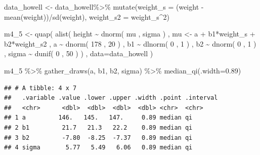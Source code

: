 \documentclass[
]{book}
\newenvironment{Shaded}{\begin{snugshade}}{\end{snugshade}}
\newcommand{\AttributeTok}[1]{\textcolor[rgb]{0.77,0.63,0.00}{#1}}
\newcommand{\DecValTok}[1]{\textcolor[rgb]{0.00,0.00,0.81}{#1}}
\newcommand{\FloatTok}[1]{\textcolor[rgb]{0.00,0.00,0.81}{#1}}
\newcommand{\FunctionTok}[1]{\textcolor[rgb]{0.00,0.00,0.00}{#1}}
\newcommand{\NormalTok}[1]{#1}
\newcommand{\OtherTok}[1]{\textcolor[rgb]{0.56,0.35,0.01}{#1}}
\newcommand{\SpecialCharTok}[1]{\textcolor[rgb]{0.00,0.00,0.00}{#1}}
\begin{document}
\begin{Shaded}
\begin{Highlighting}[]
\NormalTok{data\_howell }\OtherTok{\textless{}{-}}\NormalTok{ data\_howell}\SpecialCharTok{\%\textgreater{}\%}
  \FunctionTok{mutate}\NormalTok{(}\AttributeTok{weight\_s =}\NormalTok{ (weight }\SpecialCharTok{{-}} \FunctionTok{mean}\NormalTok{(weight))}\SpecialCharTok{/}\FunctionTok{sd}\NormalTok{(weight),}
         \AttributeTok{weight\_s2 =}\NormalTok{ weight\_s}\SpecialCharTok{\^{}}\DecValTok{2}\NormalTok{)}

\NormalTok{m4\_5 }\OtherTok{\textless{}{-}} \FunctionTok{quap}\NormalTok{(}
    \FunctionTok{alist}\NormalTok{(}
\NormalTok{        height }\SpecialCharTok{\textasciitilde{}} \FunctionTok{dnorm}\NormalTok{( mu , sigma ) ,}
\NormalTok{        mu }\OtherTok{\textless{}{-}}\NormalTok{ a }\SpecialCharTok{+}\NormalTok{ b1}\SpecialCharTok{*}\NormalTok{weight\_s }\SpecialCharTok{+}\NormalTok{ b2}\SpecialCharTok{*}\NormalTok{weight\_s2 ,}
\NormalTok{        a }\SpecialCharTok{\textasciitilde{}} \FunctionTok{dnorm}\NormalTok{( }\DecValTok{178}\NormalTok{ , }\DecValTok{20}\NormalTok{ ) ,}
\NormalTok{        b1 }\SpecialCharTok{\textasciitilde{}} \FunctionTok{dlnorm}\NormalTok{( }\DecValTok{0}\NormalTok{ , }\DecValTok{1}\NormalTok{ ) ,}
\NormalTok{        b2 }\SpecialCharTok{\textasciitilde{}} \FunctionTok{dnorm}\NormalTok{( }\DecValTok{0}\NormalTok{ , }\DecValTok{1}\NormalTok{ ) ,}
\NormalTok{        sigma }\SpecialCharTok{\textasciitilde{}} \FunctionTok{dunif}\NormalTok{( }\DecValTok{0}\NormalTok{ , }\DecValTok{50}\NormalTok{ )}
\NormalTok{    ) , }\AttributeTok{data=}\NormalTok{data\_howell )}

\NormalTok{m4\_5 }\SpecialCharTok{\%\textgreater{}\%}
  \FunctionTok{gather\_draws}\NormalTok{(a, b1, b2, sigma) }\SpecialCharTok{\%\textgreater{}\%}
  \FunctionTok{median\_qi}\NormalTok{(}\AttributeTok{.width=}\FloatTok{0.89}\NormalTok{)}
\end{Highlighting}
\end{Shaded}

\begin{verbatim}
## # A tibble: 4 x 7
##   .variable .value .lower .upper .width .point .interval
##   <chr>      <dbl>  <dbl>  <dbl>  <dbl> <chr>  <chr>    
## 1 a         146.   145.   147.     0.89 median qi       
## 2 b1         21.7   21.3   22.2    0.89 median qi       
## 3 b2         -7.80  -8.25  -7.37   0.89 median qi       
## 4 sigma       5.77   5.49   6.06   0.89 median qi
\end{verbatim}
\end{document}
